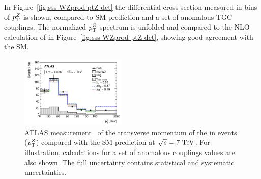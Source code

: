 \begin{table}[htp]
\begin{center}
\caption{Summary of measured fiducial and total $\WZ$ production cross sections from ATLAS 
at 7 TeV center-of-mass energies in the $\ll\lnu$ final state. The fiducial definitions differ from the 7 and 8 TeV analysis. Furthermore, the 7 TeV analysis
quotes the sum for the $e$ and $\mu$ channels, the 8 TeV analysis quotes the combination of channels. Thus, the two fiducial cross sections cannot be 
compared directly.}
\end{center}
\label{tab:sss-WZprod-xsec}
\end{table}%


In Figure~\ref{fig:sss-WZprod-ptZ-det} the differential cross section measured in bins of 
$p_{\mathrm{T}}^Z$ is shown, compared to SM prediction and a set of anomalous TGC couplings. 
The normalized $p_{\mathrm{T}}^Z$ spectrum is unfolded and compared to the NLO calculation of \mcatnlo in 
Figure~\ref{fig:sss-WZprod-ptZ-det}, showing good agreement with the SM.


\begin{figure}[htbp]
  \begin{center}
  \includegraphics[width=0.45\textwidth]{figures/sss-inclboson-diboson-wzprod-ptZ-det.pdf}
  \caption{ATLAS measurement~\cite{Aad:2012twa} of the transverse momentum of the \Zboson\; in \WZ\; events ($p_{\mathrm{T}}^Z$) compared with the SM prediction at $\rts = 7\TeV$. For illustration, calculations for a set of anomalous couplings values are also shown. The full uncertainty contains statistical and systematic uncertainties.}
\label{fig:sss-WZprod-ptZ}
\end{center}
\end{figure}

